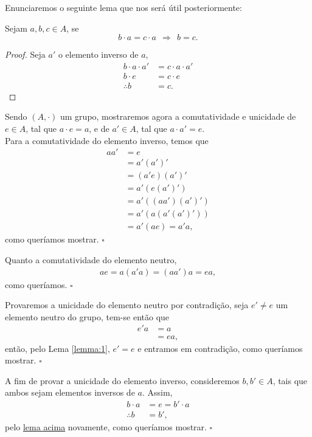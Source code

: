 \documentclass[11pt,openany]{book}
\begin{document}
    \vspace{1.5em}

    Enunciaremos o seguinte lema que nos será útil posteriormente:\\
    \begin{lemma}
    \label{lemma:1}
        Sejam $a,b,c \in A$, se \[b\cdot a=c\cdot a \ \ \Rightarrow \ \ b=c.\]
    \end{lemma}
    \begin{proof}
        Seja $a'$ o elemento inverso de $a$,
        \begin{align*}
            b\cdot a\cdot a' &= c\cdot a\cdot a'\\
            b\cdot e &= c\cdot e\\
            \therefore b&= c.
        \end{align*}
    \end{proof}

    \begin{proposition}
    \label{prop:comutatividade_unicidade}
        Sendo $(A, \cdot)$ um grupo, mostraremos agora a comutatividade e unicidade de $e \in A$, tal que $a\cdot e = a$, e de $a' \in A$, tal que $a\cdot a' = e$.\\
    
        Para a comutatividade do elemento inverso, temos que
        \begin{align*}
            aa' &= e \\
            &= a'(a')' \\
            &= (a'e)(a')' \\
            &= a'(e(a')') \\
            &= a'((aa')(a')') \\
            &= a'(a(a'(a')')) \\
            &= a'(ae) = a'a,
        \end{align*}
        como queríamos mostrar. $\square$
    
        Quanto a comutatividade do elemento neutro,
        \begin{align*}
            ae = a(a'a) = (aa')a = ea,
        \end{align*}
        como queríamos. $\square$
    
        Provaremos a unicidade do elemento neutro por contradição, seja $e' \not= e$ um elemento neutro do grupo, tem-se então que
        \begin{align*}
            e'a &= a \\
            &= ea,
        \end{align*}
        então, pelo Lema \ref{lemma:1}, $e'=e$ e entramos em contradição, como queríamos mostrar. $\square$
    
        A fim de provar a unicidade do elemento inverso, consideremos $b, b' \in A$, tais que ambos sejam elementos inversos de $a$. Assim,
        \begin{align*}
            b\cdot a &= e = b'\cdot a\\
            \therefore b &= b',
        \end{align*}
        pelo \hyperref[lemma:1]{lema acima} novamente, como queríamos mostrar. $\square$
    \end{proposition}
\end{document}
